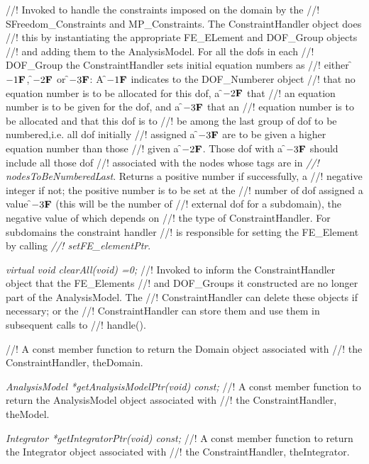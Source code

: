 //! Invoked to handle the constraints imposed on the domain by the
//! SFreedom\_Constraints and MP\_Constraints. The ConstraintHandler object does
//! this by instantiating the appropriate FE\_ELement and DOF\_Group objects 
//! and adding them to the AnalysisModel. For all the dofs in each
//! DOF\_Group the ConstraintHandler sets initial equation numbers as
//! either \f$-1{\bf F}$, \f$-2{\bf F}$ or \f$-3{\bf F}$: A \f$-1{\bf F}$ indicates to the DOF\_Numberer object
//! that no equation number is to be allocated for this dof, a \f$-2{\bf F}$ that
//! an equation number is to be given for the dof, and a \f$-3{\bf F}$ that an
//! equation number is to be allocated and that this dof is to
//! be among the last group of dof to be numbered,i.e. all dof initially
//! assigned a \f$-3{\bf F}$ are to be given a higher equation number than those
//! given a \f$-2{\bf F}$. Those dof with a \f$-3{\bf F}$ should include all those dof
//! associated with the nodes whose tags are in {\em
//! nodesToBeNumberedLast}. Returns a positive number if successfully, a
//! negative integer if not; the positive number is to be set at the
//! number of dof assigned a value \f$-3{\bf F}$ (this will be the number of
//! external dof for a subdomain), the negative value of which depends on
//! the type of ConstraintHandler. For subdomains the constraint handler
//! is responsible for setting the FE\_Element by calling {\em
//! setFE\_elementPtr}.    

{\em virtual void clearAll(void) =0;}
//! Invoked to inform the ConstraintHandler object that the FE\_Elements
//! and DOF\_Groups it constructed are no longer part of the AnalysisModel. The
//! ConstraintHandler can delete these objects if necessary; or the
//! ConstraintHandler can store them and use them in subsequent calls to
//! handle(). 

//! A const member function to return the Domain object associated with
//! the ConstraintHandler, \p theDomain.

{\em AnalysisModel *getAnalysisModelPtr(void) const;}
//! A const member function to return the AnalysisModel object associated with
//! the ConstraintHandler, \p theModel.

{\em Integrator *getIntegratorPtr(void) const;}
//! A const member function to return the Integrator object associated with
//! the ConstraintHandler, \p theIntegrator. 





